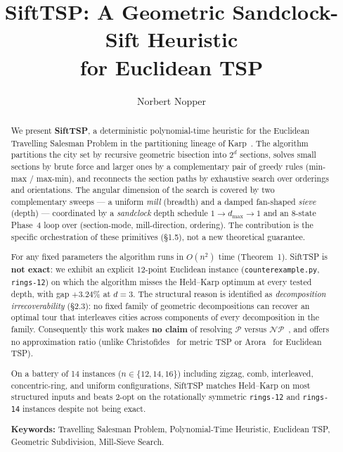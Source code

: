 \documentclass[11pt,a4paper]{article}
\title{SiftTSP: A Geometric Sandclock-Sift Heuristic\\ for Euclidean TSP}
\author{Norbert Nopper}
\date{}
\begin{document}
\maketitle

\begin{abstract}
We present \textbf{SiftTSP}, a deterministic polynomial-time heuristic for the
Euclidean Travelling Salesman Problem in the partitioning lineage of
Karp~\cite{karp1977}. The algorithm partitions the city set by recursive geometric
bisection into $2^d$ sections, solves small sections by brute force and
larger ones by a complementary pair of greedy rules (min-max / max-min),
and reconnects the section paths by exhaustive search over orderings and
orientations. The angular dimension of the search is covered by two
complementary sweeps --- a uniform \emph{mill} (breadth) and a damped
fan-shaped \emph{sieve} (depth) --- coordinated by a \emph{sandclock}
depth schedule $1 \to d_{\max} \to 1$ and an 8-state Phase~4 loop over
(section-mode, mill-direction, ordering). The contribution is the
specific orchestration of these primitives (\S1.5), not a new
theoretical guarantee.

For any fixed parameters the algorithm runs in $O(n^2)$ time
(Theorem~1). SiftTSP is \textbf{not exact}: we exhibit an explicit
12-point Euclidean instance (\texttt{counterexample.py}, \texttt{rings-12})
on which the algorithm misses the Held--Karp optimum at every tested
depth, with gap $+3.24\%$ at $d=3$. The structural reason is identified
as \emph{decomposition irrecoverability} (\S2.3): no fixed family of
geometric decompositions can recover an optimal tour that interleaves
cities across components of every decomposition in the family.
Consequently this work makes \textbf{no claim} of resolving
$\mathcal{P}$ versus $\mathcal{NP}$~\cite{cook1971,levin1973,aaronson2009}, and offers no
approximation ratio (unlike Christofides~\cite{christofides1976} for metric TSP or
Arora~\cite{arora1998} for Euclidean TSP).

On a battery of 14 instances ($n \in \{12, 14, 16\}$) including zigzag,
comb, interleaved, concentric-ring, and uniform configurations, SiftTSP
matches Held--Karp on most structured inputs and beats 2-opt on the
rotationally symmetric \texttt{rings-12} and \texttt{rings-14} instances
despite not being exact.

\medskip
\noindent\textbf{Keywords:} Travelling Salesman Problem, Polynomial-Time
Heuristic, Euclidean TSP, Geometric Subdivision, Mill-Sieve Search.
\end{abstract}
\end{document}
